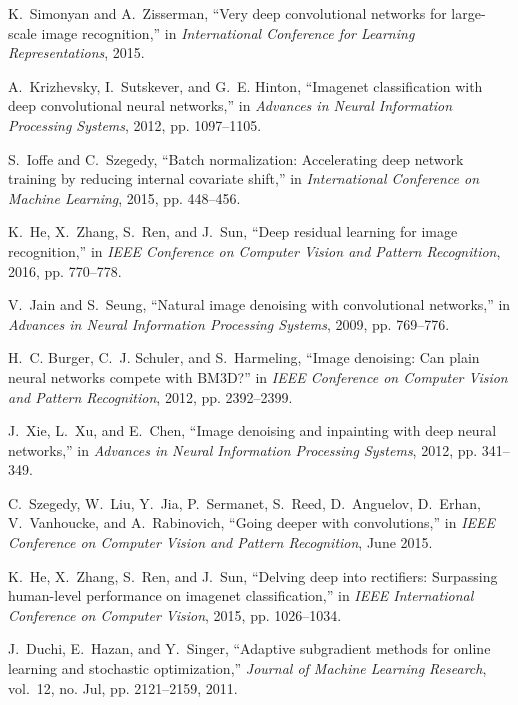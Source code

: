 \documentclass[journal]{IEEEtran}
\begin{document}
\begin{thebibliography}{10}
K.~Simonyan and A.~Zisserman, ``Very deep convolutional networks for
  large-scale image recognition,'' in \emph{International Conference for
  Learning Representations}, 2015.

A.~Krizhevsky, I.~Sutskever, and G.~E. Hinton, ``Imagenet classification with
  deep convolutional neural networks,'' in \emph{Advances in Neural Information
  Processing Systems}, 2012, pp. 1097--1105.

S.~Ioffe and C.~Szegedy, ``Batch normalization: Accelerating deep network
  training by reducing internal covariate shift,'' in \emph{International
  Conference on Machine Learning}, 2015, pp. 448--456.

K.~He, X.~Zhang, S.~Ren, and J.~Sun, ``Deep residual learning for image
  recognition,'' in \emph{IEEE Conference on Computer Vision and Pattern
  Recognition}, 2016, pp. 770--778.

V.~Jain and S.~Seung, ``Natural image denoising with convolutional networks,''
  in \emph{Advances in Neural Information Processing Systems}, 2009, pp.
  769--776.

H.~C. Burger, C.~J. Schuler, and S.~Harmeling, ``Image denoising: Can plain
  neural networks compete with {BM3D}?'' in \emph{IEEE Conference on Computer
  Vision and Pattern Recognition}, 2012, pp. 2392--2399.

J.~Xie, L.~Xu, and E.~Chen, ``Image denoising and inpainting with deep neural
  networks,'' in \emph{Advances in Neural Information Processing Systems},
  2012, pp. 341--349.

C.~Szegedy, W.~Liu, Y.~Jia, P.~Sermanet, S.~Reed, D.~Anguelov, D.~Erhan,
  V.~Vanhoucke, and A.~Rabinovich, ``Going deeper with convolutions,'' in
  \emph{IEEE Conference on Computer Vision and Pattern Recognition}, June 2015.

K.~He, X.~Zhang, S.~Ren, and J.~Sun, ``Delving deep into rectifiers: Surpassing
  human-level performance on imagenet classification,'' in \emph{IEEE
  International Conference on Computer Vision}, 2015, pp. 1026--1034.

J.~Duchi, E.~Hazan, and Y.~Singer, ``Adaptive subgradient methods for online
  learning and stochastic optimization,'' \emph{Journal of Machine Learning
  Research}, vol.~12, no. Jul, pp. 2121--2159, 2011.


\end{thebibliography}
\end{document}
